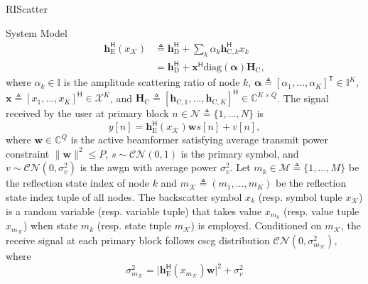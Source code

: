 \documentclass[journal]{IEEEtran}
\begin{document}
\begin{section}{RIScatter}
\begin{subsection}{System Model}
		\begin{subequations}
			\label{eq:equivalent_channel}
			\begin{align}
				\boldsymbol{h}_{\text{E}}^\mathsf{H}(x_{\mathcal{K}})
				 & \triangleq \boldsymbol{h}_{\text{D}}^\mathsf{H} + \sum_{k} \alpha_k \boldsymbol{h}_{\text{C},k}^\mathsf{H} x_k \label{eq:equivalent_channel_bc}                    \\
				 & = \boldsymbol{h}_{\text{D}}^\mathsf{H} + \boldsymbol{x}^\mathsf{H} \mathrm{diag}(\boldsymbol{\alpha}) \boldsymbol{H}_{\text{C}}, \label{eq:equivalent_channel_ris}
			\end{align}
		\end{subequations}
		where $\alpha_k \in \mathbb{I}$ is the amplitude scattering ratio of node $k$, $\boldsymbol{\alpha} \triangleq [\alpha_1,\ldots,\alpha_K]^\mathsf{T} \in \mathbb{I}^{K}$, $\boldsymbol{x} \triangleq [x_1,\ldots,x_K]^\mathsf{H} \in \mathcal{X}^{K}$, and $\boldsymbol{H}_{\text{C}} \triangleq [\boldsymbol{h}_{\text{C},1},\ldots,\boldsymbol{h}_{\text{C},K}]^\mathsf{H} \in \mathbb{C}^{K \times Q}$.
		The signal received by the user at primary block $n \in \mathcal{N} \triangleq \{1,\ldots,N\}$ is
		\begin{equation}
			y[n] = \boldsymbol{h}_{\text{E}}^\mathsf{H}(x_{\mathcal{K}}) \boldsymbol{w} s[n] + v[n],
			\label{eq:receive_signal}
		\end{equation}
		where $\boldsymbol{w} \in \mathbb{C}^{Q}$ is the active beamformer satisfying average transmit power constraint $\lVert \boldsymbol{w} \rVert^2 \le P$, $s \sim \mathcal{CN}(0,1)$ is the primary symbol, and $v \sim \mathcal{CN}(0,\sigma_v^2)$ is the \gls{awgn} with average power $\sigma_v^2$.
		Let $m_k \in \mathcal{M} \triangleq \{1,\ldots,M\}$ be the reflection state index of node $k$ and $m_{\mathcal{K}} \triangleq (m_1,\ldots,m_K)$ be the reflection state index tuple of all nodes.
		The backscatter symbol $x_k$ (resp. symbol tuple $x_{\mathcal{K}}$) is a random variable (resp. variable tuple) that takes value $x_{m_k}$ (resp. value tuple $x_{m_{\mathcal{K}}}$) when state $m_k$ (resp. state tuple $m_{\mathcal{K}}$) is employed.
		Conditioned on $m_{\mathcal{K}}$, the receive signal at each primary block follows \gls{cscg} distribution $\mathcal{CN}(0,\sigma_{m_{\mathcal{K}}}^2)$, where
		\begin{equation}
			\sigma_{m_{\mathcal{K}}}^2 = \lvert \boldsymbol{h}_{\text{E}}^\mathsf{H}(x_{m_{\mathcal{K}}}) \boldsymbol{w} \rvert^2 + \sigma_v^2
			\label{eq:receive_variance}
		\end{equation}

\end{subsection}
\end{section}
\end{document}
